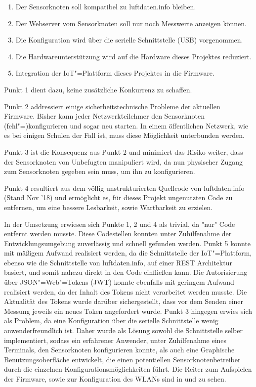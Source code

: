 \begin{enumerate}
	\item Der Sensorknoten soll kompatibel zu luftdaten.info bleiben.
	\item Der Webserver vom Sensorknoten soll nur noch Messwerte anzeigen können.
	\item Die Konfiguration wird über die serielle Schnittstelle (USB) vorgenommen.
	\item Die Hardwareunterstützung wird auf die Hardware dieses Projektes reduziert.
	\item Integration der IoT"=Plattform dieses Projektes in die Firmware.
\end{enumerate}

Punkt 1 dient dazu, keine zusätzliche Konkurrenz zu schaffen.

Punkt 2 addressiert einige sicherheitstechnische Probleme der aktuellen Firmware.
Bisher kann jeder Netzwerkteilehmer den Sensorknoten (fehl"=)konfigurieren und sogar neu starten.
In einem öffentlichen Netzwerk, wie es bei einigen Schulen der Fall ist, muss diese Möglichkeit unterbunden werden.

Punkt 3 ist die Konsequenz aus Punkt 2 und minimiert das Risiko weiter, dass der Sensorknoten von Unbefugten manipuliert wird, da nun physischer Zugang zum Sensorknoten gegeben sein muss, um ihn zu konfigurieren.

Punkt 4 resultiert aus dem völlig unstrukturierten Quellcode von luftdaten.info (Stand Nov '18) und ermöglicht es, für dieses Projekt ungenutzten Code zu entfernen, um eine bessere Lesbarkeit, sowie Wartbarkeit zu erzielen.

In der Umsetzung erwiesen sich Punkte 1, 2 und 4 als trivial, da "nur" Code entfernt werden musste.
Diese Codestellen konnten unter Zuhilfenahme der Entwicklungsumgebung zuverlässig und schnell gefunden werden.
Punkt 5 konnte mit mäßigem Aufwand realisiert werden, da die Schnittstelle der IoT"=Plattform, ebenso wie die Schnittstelle von luftdaten.info, auf einer REST Architektur basiert, und somit nahezu direkt in den Code einfließen kann.
Die Autorisierung über JSON"=Web"=Tokens (JWT) konnte ebenfalls mit geringem Aufwand realisiert werden, da der Inhalt des Tokens nicht verarbeitet werden musste.
Die Aktualität des Tokens wurde darüber sichergestellt, dass vor dem Senden einer Messung jeweils ein neues Token angefordert wurde.
Punkt 3 hingegen erwies sich als Problem, da eine Konfiguration über die serielle Schnittstelle wenig anwenderfreundlich ist.
Daher wurde als Lösung sowohl die Schnittstelle selber implementiert, sodass ein erfahrener Anwender, unter Zuhilfenahme eines Terminals, den Sensorknoten konfigurieren konnte, als auch eine Graphische Benutzungsoberfläche entwickelt, die einen potentiellen Sensorknotenbetreiber durch die einzelnen Konfigurationsmöglichkeiten führt.
Die Reiter zum Aufspielen der Firmware, sowie zur Konfiguration des WLANs sind in  und  zu sehen.

